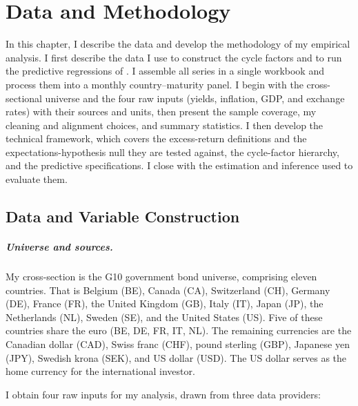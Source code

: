 \chapter{Data and Methodology}
\label{ch:data}
\label{ch:methodology}

In this chapter, I describe the data and develop the methodology of my
empirical analysis. I first describe the data I use to construct the cycle
factors and to run the predictive regressions of . I assemble
all series in a single workbook and process them into a
monthly country--maturity panel. I
begin with the cross-sectional universe and the four raw inputs (yields,
inflation, GDP, and exchange rates) with their sources and units, then present
the sample coverage, my cleaning and alignment choices, and summary statistics.
I then develop the technical framework, which covers the excess-return
definitions and the expectations-hypothesis null they are tested against, the
cycle-factor hierarchy, and the predictive specifications. I close with the estimation and
inference used to evaluate them.

\section{Data and Variable Construction}
\label{sec:data}

\paragraph{Universe and sources.}
My cross-section is the G10 government bond universe, comprising eleven
countries. That is Belgium (BE), Canada (CA), Switzerland (CH), Germany (DE), France
(FR), the United Kingdom (GB), Italy (IT), Japan (JP), the Netherlands (NL),
Sweden (SE), and the United States (US). Five of these countries share the euro
(BE, DE, FR, IT, NL). The remaining currencies are the Canadian dollar (CAD),
Swiss franc (CHF), pound sterling (GBP), Japanese yen (JPY), Swedish krona
(SEK), and US dollar (USD). The US dollar serves as the home currency for the
international investor.

I obtain four raw inputs for my analysis, drawn from three data providers:


